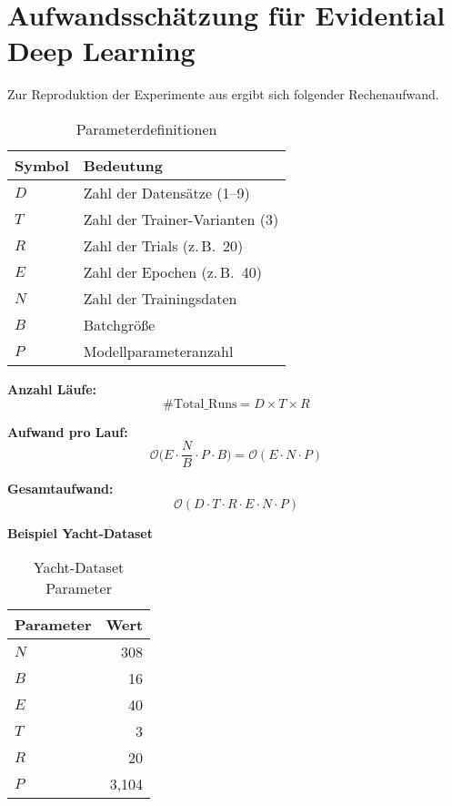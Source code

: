 \pagebreak

\section*{Aufwandsschätzung für Evidential Deep Learning}
\label{sec:aufwand-edl-amini}

Zur Reproduktion der Experimente aus \parencite{amini2020deep} ergibt sich folgender Rechenaufwand.

\vspace{0.5em}

\begin{table}[!htbp]
  \centering
  \begin{tabular}{ll}
    \toprule
    \textbf{Symbol} & \textbf{Bedeutung} \\
    \midrule
    $D$ & Zahl der Datensätze (1–9) \\
    $T$ & Zahl der Trainer-Varianten (3) \\
    $R$ & Zahl der Trials (z.\,B.\ 20) \\
    $E$ & Zahl der Epochen (z.\,B.\ 40) \\
    $N$ & Zahl der Trainingsdaten \\
    $B$ & Batchgröße \\
    $P$ & Modellparameteranzahl \\
    \bottomrule
  \end{tabular}
  \caption{Parameterdefinitionen}
\end{table}

\vspace{-0.5em}

\textbf{Anzahl Läufe:}
\[
\text{\#Total\_Runs} = D \times T \times R
\]

\textbf{Aufwand pro Lauf:}
\[
\mathcal{O}\biggl(E \cdot \frac{N}{B} \cdot P \cdot B \biggr) 
=
\mathcal{O}(E \cdot N \cdot P)
\]

\textbf{Gesamtaufwand:}
\[
\boxed{
\mathcal{O}\left( D \cdot T \cdot R \cdot E \cdot N \cdot P \right)
}
\]

\vspace{1em}

\noindent
\textbf{Beispiel Yacht-Dataset}

\vspace{0.3em}

\begin{table}[!htbp]
  \centering
  \begin{tabular}{lr}
    \toprule
    \textbf{Parameter} & \textbf{Wert} \\
    \midrule
    $N$ & 308 \\
    $B$ & 16 \\
    $E$ & 40 \\
    $T$ & 3 \\
    $R$ & 20 \\
    $P$ & 3,104 \\
    \bottomrule
  \end{tabular}
  \caption{Yacht-Dataset Parameter}
\end{table}

